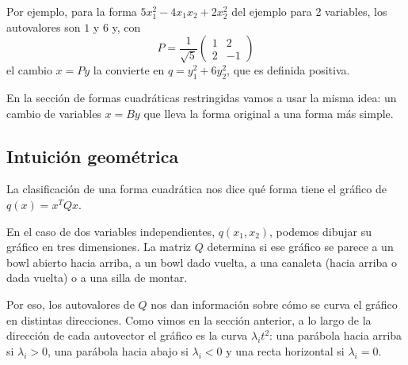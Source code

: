 \documentclass{article}
\begin{document}
Por ejemplo, para la forma \(5x_1^2-4x_1x_2+2x_2^2\) del ejemplo para 2 variables, los autovalores son \(1\) y \(6\) y, con
\[
P=\frac{1}{\sqrt{5}}
\begin{pmatrix}
1 & 2\\
2 & -1
\end{pmatrix}
\]
el cambio \(x=Py\) la convierte en \(q=y_1^2+6y_2^2\), que es definida positiva.

En la sección de formas cuadráticas restringidas vamos a usar la misma idea: un cambio de variables \(x=By\) que lleva la forma original a una forma más simple.


\subsection*{Intuición geométrica}

La clasificación de una forma cuadrática nos dice qué forma tiene el gráfico de \(q(x)=x^TQx\).

En el caso de dos variables independientes, \(q(x_1,x_2)\), podemos dibujar su gráfico en tres dimensiones. La matriz \(Q\) determina si ese gráfico se parece a un bowl abierto hacia arriba, a un bowl dado vuelta, a una canaleta (hacia arriba o dada vuelta) o a una silla de montar.

Por eso, los autovalores de \(Q\) nos dan información sobre cómo se curva el gráfico en distintas direcciones. Como vimos en la sección anterior, a lo largo de la dirección de cada autovector el gráfico es la curva \(\lambda_it^2\): una parábola hacia arriba si \(\lambda_i>0\), una parábola hacia abajo si \(\lambda_i<0\) y una recta horizontal si \(\lambda_i=0\).
\end{document}
